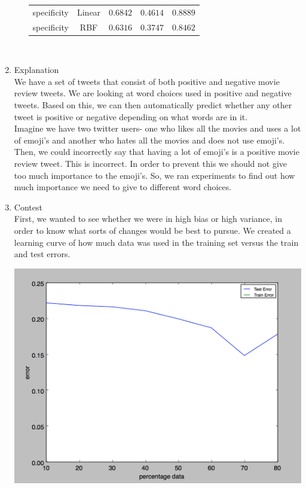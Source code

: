 \documentclass[11pt]{article}
\begin{document}
\begin{enumerate}
\begin{enumerate}[(a)]
\begin{tabular}{| c | c | c | c | c |}
specificity & Linear & $0.6842$ & $0.4614$ & $0.8889$ \\
specificity & RBF & $0.6316$ & $0.3747$ & $0.8462$ \\
\hline
\end{tabular} \\
\end{enumerate}
\item Explanation \\
We have a set of tweets that consist of both positive and negative movie review tweets. We are looking at word choices used in positive and negative tweets. Based on this, we can then automatically predict whether any other tweet is positive or negative depending on what words are in it. \\
Imagine we have two twitter users- one who likes all the movies and uses a lot of emoji's and another who hates all the movies and does not use emoji's. Then, we could incorrectly say that having a lot of emoji's is a positive movie review tweet. This is incorrect. In order to prevent this we should not give too much importance to the emoji's. So, we ran experiments to find out how much importance we need to give to different word choices. 
\item Contest\\
First, we wanted to see whether we were in high bias or high variance, in order to know what sorts of changes
would be best to pursue. We created a learning curve of how much data was used in the training set versus
the train and test errors.

\includegraphics[scale=0.7]{learningcurve}


\end{enumerate}
\end{document}
